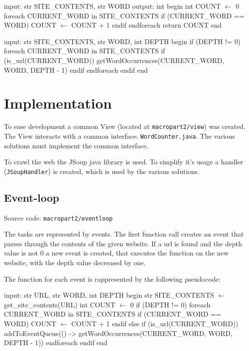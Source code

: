 \documentclass[12pt, a4paper]{report}
\begin{document}
\newpage

\begin{algorithm}[caption={countTask expressed in pseudocode}, label={alg1}]
input: str SITE_CONTENTS, str WORD
output: int
begin
    int COUNT $\gets$ 0
    foreach CURRENT_WORD in SITE_CONTENTS
        if (CURRENT_WORD == WORD)
            COUNT $\gets$ COUNT + 1
        endif
    endforeach
    return COUNT
end       
\end{algorithm}

\begin{algorithm}[caption={linkTask expressed in pseudocode}, label={alg2}]
input: str SITE_CONTENTS, str WORD, int DEPTH
begin
    if (DEPTH != 0)
        foreach CURRENT_WORD in SITE_CONTENTS
            if (is_url(CURRENT_WORD))
                getWordOccurrences(CURRENT_WORD, WORD, DEPTH - 1)
            endif
        endforeach
    endif
end       
\end{algorithm}

\section{Implementation}
To ease development a common View (located at \texttt{macropart2/view}) was created. The View interacts with a common interface: \texttt{WordCounter.java}.
 The various solutions must implement the common interface.

To crawl the web the JSoup java library is used. To simplify it's usage a handler (\texttt{JSoupHandler}) is created, which is used by the various solutions.

\subsection{Event-loop}
Source code: \texttt{macropart2/eventloop}

The tasks are represented by events. The first function call creates an event that parses through the contents of the given website.
 If a url is found and the depth value is not 0 a new event is created, that executes the function on the new website, with the depth value decreased by one.

 The function for each event is rappresented by the following pseudocode:

\newpage

\begin{algorithm}[label={alg3}]
input: str URL, str WORD, int DEPTH
begin
    str SITE_CONTENTS $\gets$ get_site_contents(URL)
    int COUNT $\gets$ 0
    if (DEPTH != 0)
        foreach CURRENT_WORD in SITE_CONTENTS
            if (CURRENT_WORD == WORD)
                COUNT $\gets$ COUNT + 1
            endif
            else if (is_url(CURRENT_WORD))
                addToEventQueue(() -> 
                    getWordOccurrences(CURRENT_WORD, WORD, DEPTH - 1))
        endforeach
    endif
end       
\end{algorithm}
\end{document}
